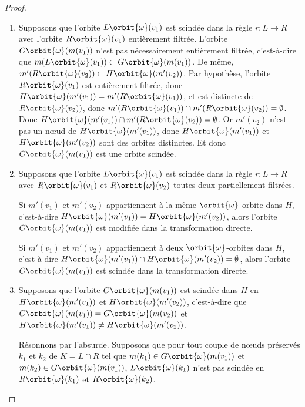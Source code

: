 \begin{proof}

	~

	\begin{enumerate}
		\item Supposons que l'orbite $L\orbit{\omega}(v_1)$ est scindée dans la règle
		      $r : L \longrightarrow R$ avec l'orbite $R\orbit{\omega}(v_1)$ entièrement filtrée.
		      L'orbite $G\orbit{\omega}(m(v_1))$ n'est pas nécessairement entièrement
		      filtrée, c'est-à-dire que $m(L\orbit{\omega}(v_1)) \subset G\orbit{\omega}(m(v_1))$.
		      De même, $m'(R\orbit{\omega}(v_2)) \subset H\orbit{\omega}(m'(v_2))$. Par hypothèse,
		      l'orbite $R\orbit{\omega}(v_1)$ est entièrement filtrée, donc
		      $H\orbit{\omega}(m'(v_1)) = m'(R\orbit{\omega}(v_1))$, et est distincte de
		      $R\orbit{\omega}(v_2))$, donc
		      $m'(R\orbit{\omega}(v_1)) \cap m'(R\orbit{\omega}(v_2)) = \emptyset$. Donc
		      $H\orbit{\omega}(m'(v_1)) \cap m'(R\orbit{\omega}(v_2)) = \emptyset$. Or $m'(v_2)$ n'est
		      pas un n\oe ud de $H\orbit{\omega}(m'(v_1))$, donc $H\orbit{\omega}(m'(v_1))$ et
		      $H\orbit{\omega}(m'(v_2))$ sont des orbites distinctes. Et donc
		      $G\orbit{\omega}(m(v_1))$ est une orbite scindée.
		\item Supposons que l'orbite $L\orbit{\omega}(v_1)$ est scindée dans la règle
		      $r : L \longrightarrow R$ avec $R\orbit{\omega}(v_1)$ et $R\orbit{\omega}(v_2)$ toutes deux
		      partiellement filtrées.

		      Si $m'(v_1)$ et $m'(v_2)$ appartiennent à la même $\orbit{\omega}$-orbite
		      dans $H$, c'est-à-dire $H\orbit{\omega}(m'(v_1)) = H\orbit{\omega}(m'(v_2))$,
		      alors l'orbite $G\orbit{\omega}(m(v_1))$ est modifiée dans la
		      transformation directe.

		      Si $m'(v_1)$ et $m'(v_2)$ appartiennent à deux $\orbit{\omega}$-orbites
		      dans $H$, c'est-à-dire
		      $H\orbit{\omega}(m'(v_1)) \cap H\orbit{\omega}(m'(v_2)) = \emptyset$, alors l'orbite
		      $G\orbit{\omega}(m(v_1))$ est scindée dans la transformation directe.


		\item Supposons que l'orbite $G\orbit{\omega}(m(v_1))$ est scindée dans $H$ en
		      $H\orbit{\omega}(m'(v_1))$ et $H\orbit{\omega}(m'(v_2))$, c'est-à-dire que
		      $G\orbit{\omega}(m(v_1)) = G\orbit{\omega}(m(v_2))$ et
		      $H\orbit{\omega}(m'(v_1)) \neq H\orbit{\omega}(m'(v_2))$. %

		      Résonnons par l'absurde. %
		      Supposons que pour tout couple de n\oe uds préservés $k_1$ et $k_2$ de
		      $K = L \cap R$ tel que $m(k_1) \in G\orbit{\omega}(m(v_1))$ et $m(k_2) \in G\orbit{\omega}(m(v_1))$, $L\orbit{\omega}(k_1)$ n'est pas scindée en $R\orbit{\omega}(k_1)$ et $R\orbit{\omega}(k_2)$. %


\end{enumerate}
\end{proof}
